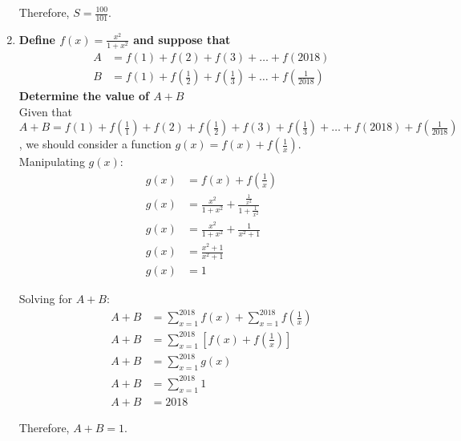 \documentclass[12pt]{article}
\begin{document}
\begin{enumerate}
    Therefore, $S = \frac{100}{101}$.
    
    \item \textbf{Define $f(x)=\frac{x^2}{1+x^2}$ and suppose that \begin{align*}
        A & = f(1) + f(2) + f(3) + \dots + f(2018) \\
        B & = f(1) + f(\frac{1}{2}) + f(\frac{1}{3}) + \dots + f(\frac{1}{2018})
    \end{align*}
    Determine the value of $A + B$} \\
    
    Given that $A + B = f(1) + f(\frac{1}{1}) + f(2) + f(\frac{1}{2}) + f(3) + f(\frac{1}{3}) + \dots + f(2018) + f(\frac{1}{2018})$, we should consider a function $g(x) = f(x) + f(\frac{1}{x})$. \\
    
    Manipulating $g(x)$:
    \begin{align*}
        g(x) & = f(x) + f(\frac{1}{x}) \\
        g(x) & = \frac{x^2}{1 + x^2} + \frac{\frac{1}{x^2}}{1 + \frac{1}{x^2}} \\
        g(x) & = \frac{x^2}{1 + x^2} + \frac{1}{x^2 + 1} \\
        g(x) & = \frac{x^2 + 1}{x^2 + 1} \\
        g(x) & = 1
    \end{align*}
    
    Solving for $A + B$:
    \begin{align*}
        A + B & = \sum_{x = 1}^{2018} f(x) + \sum_{x = 1}^{2018} f(\frac{1}{x}) \\
        A + B & = \sum_{x = 1}^{2018} [f(x) + f(\frac{1}{x})] \\
        A + B & = \sum_{x = 1}^{2018} g(x) \\
        A + B & = \sum_{x = 1}^{2018} 1 \\
        A + B & = 2018
    \end{align*}
    
    Therefore, $A + B = 1$.
    
\end{enumerate}
\end{document}
